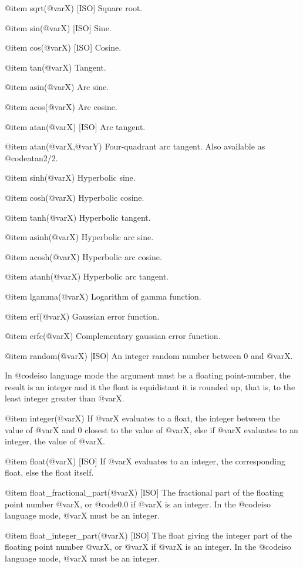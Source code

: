 {{{{@item sqrt(@var{X}) [ISO]
Square root.

@item sin(@var{X}) [ISO]
Sine.

@item cos(@var{X}) [ISO]
Cosine.

@item tan(@var{X})
Tangent.

@item asin(@var{X})
Arc sine.

@item acos(@var{X})
Arc cosine.

@item atan(@var{X}) [ISO]
Arc tangent.

@item atan(@var{X},@var{Y})
Four-quadrant arc tangent. Also available as @code{atan2/2}.

@item sinh(@var{X})
Hyperbolic sine.

@item cosh(@var{X})
Hyperbolic cosine.

@item tanh(@var{X})
Hyperbolic tangent.

@item asinh(@var{X})
Hyperbolic arc sine.

@item acosh(@var{X})
Hyperbolic arc cosine.

@item atanh(@var{X})
Hyperbolic arc tangent.

@item lgamma(@var{X})
Logarithm of gamma function.

@item erf(@var{X})
Gaussian error function.

@item erfc(@var{X})
Complementary gaussian error function.

@item random(@var{X}) [ISO]
An integer random number between 0 and @var{X}.

In @code{iso} language mode the argument must be a floating
point-number, the result is an integer and it the float is equidistant
it is rounded up, that is, to the least integer greater than @var{X}.

@item integer(@var{X})
If @var{X} evaluates to a float, the integer between the value of @var{X}
and 0 closest to the value of @var{X}, else if @var{X} evaluates to an
integer, the value of @var{X}.

@item float(@var{X}) [ISO]
If @var{X} evaluates to an integer, the corresponding float, else the float
itself.

@item float_fractional_part(@var{X}) [ISO]
The fractional part of the floating point number @var{X}, or @code{0.0}
if @var{X} is an integer. In the @code{iso} language mode,
@var{X} must be an integer.

@item float_integer_part(@var{X}) [ISO]
The float giving the integer part of the floating point number @var{X},
or @var{X} if @var{X} is an integer. In the @code{iso} language mode,
@var{X} must be an integer.

}}}}
